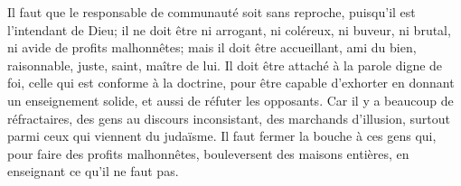 Il faut que le responsable de communauté soit sans reproche,
	puisqu’il est l’intendant de Dieu;
	il ne doit être ni arrogant, ni coléreux,
	ni buveur, ni brutal, ni avide de profits malhonnêtes;
	mais il doit être accueillant, ami du bien, raisonnable, juste, saint, maître de lui.
Il doit être attaché à la parole digne de foi, celle qui est conforme à la doctrine,
	pour être capable d’exhorter en donnant un enseignement solide,
	et aussi de réfuter les opposants.
Car il y a beaucoup de réfractaires, des gens au discours inconsistant,
	des marchands d’illusion, surtout parmi ceux qui viennent du judaïsme.
Il faut fermer la bouche à ces gens qui, pour faire des profits malhonnêtes,
	bouleversent des maisons entières, en enseignant ce qu’il ne faut pas.

